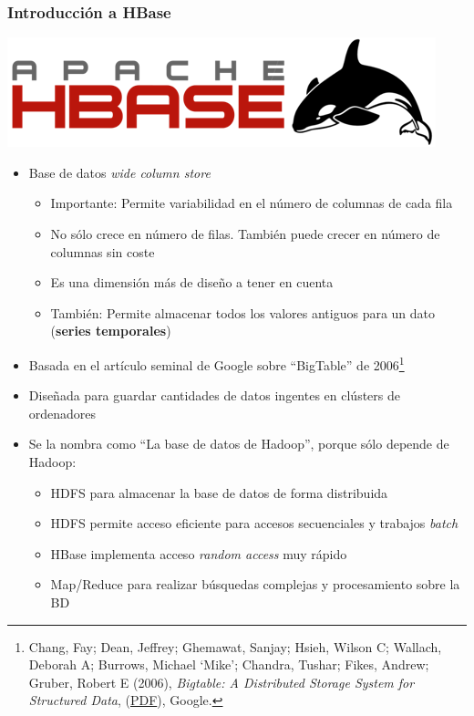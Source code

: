 \documentclass[14pt]{beamer}
\begin{document}
\begin{frame}[allowframebreaks]
\frametitle{Introducción a HBase}
\begin{center}
  \includegraphics[width=.5\textwidth]{img/hbase_logo}
\end{center}
\begin{itemize}
\item Base de datos {\em wide column store}
\begin{itemize}
\item Importante: Permite variabilidad en el número de columnas de cada
  fila
\item No sólo crece en número de filas. También puede crecer en número de
  columnas sin coste
\item Es una dimensión más de diseño a tener en cuenta
\item También: Permite almacenar todos los valores antiguos para un dato
  ({\bf series temporales})
\end{itemize}
\item Basada en el artículo seminal de Google sobre ``BigTable'' de
  2006\footnote{Chang, Fay; Dean, Jeffrey; Ghemawat, Sanjay; Hsieh,
    Wilson C; Wallach, Deborah A; Burrows, Michael ‘Mike’; Chandra,
    Tushar; Fikes, Andrew; Gruber, Robert E (2006), {\em Bigtable: A
      Distributed Storage System for Structured Data},
    (\href{http://research.google.com/archive/bigtable-osdi06.pdf}{PDF}),
    Google.}
\item Diseñada para guardar cantidades de datos ingentes en clústers de
  ordenadores
\item Se la nombra como ``La base de datos de Hadoop'', porque sólo depende
  de Hadoop:
  \begin{itemize}
  \item HDFS para almacenar la base de datos de forma distribuida
  \item HDFS permite acceso eficiente para accesos secuenciales y trabajos
    {\em batch\/}
  \item HBase implementa acceso {\em random access} muy rápido
  \item Map/Reduce para realizar búsquedas complejas y procesamiento sobre
    la BD
  \end{itemize}

\framebreak


\end{itemize}
\end{frame}
\end{document}
